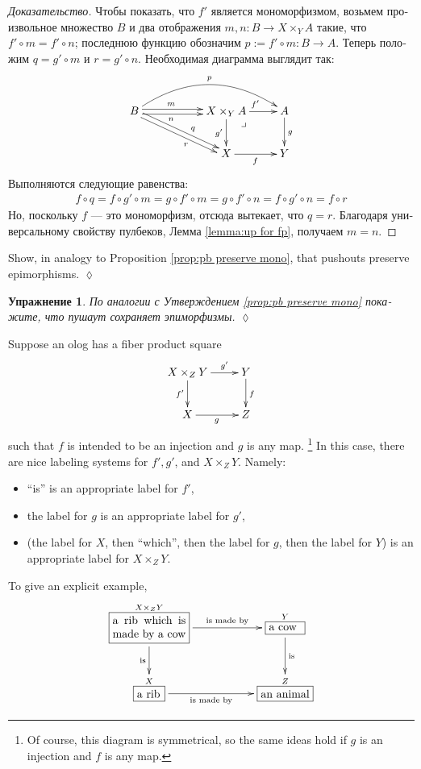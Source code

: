 \documentclass[a4paper]{book}
\makeatletter
\def\tn{\textnormal}
\def\to{\rightarrow}
\def\taking{\colon}
\newcommand{\LA}[2]{\ar[#1]^-{\tn {#2}}}
\newcommand{\LAL}[2]{\ar[#1]_-{\tn {#2}}}
\newcommand{\obox}[3]{\stackrel{#1}{\fbox{\parbox{#2}{#3}}}}
\def\ullimit{\ar@{}[rd]|(.3)*+{\lrcorner}}
\theoremstyle{myth}
\newtheorem{exampleENG}[envENG]{\begin{english}Example\end{english}}
\newtheorem{excENG}[envENG]{\begin{english}Exercise\end{english}}
\newenvironment{exerciseENG}{\begin{excENG}}{\hspace*{\fill}$\lozenge$\end{excENG}}
\newtheorem{excRUS}[envRUS]{Упражнение}
\newenvironment{proofRUS}{\begin{proof}[Доказательство]}{\end{proof}}
\newenvironment{exerciseRUS}{\begin{excRUS}}{\hspace*{\fill}$\lozenge$\end{excRUS}}
\makeatother
\begin{document}
\begin{russian}
\begin{proofRUS}
Чтобы показать, что $f'$ является мономорфизмом, возьмем произвольное множество $B$ и два отображения $m,n\taking B\to X\times_YA$ такие, что $f'\circ m=f'\circ n$; последнюю функцию обозначим $p:=f'\circ m\taking B\to A$. Теперь положим $q=g'\circ m$ и $r=g'\circ n$. Необходимая диаграмма выглядит так:
$$
\xymatrix{B\ar@<.5ex>[rr]^(.4)m\ar@<-.5ex>[rr]_(.4)n\ar@/^2pc/[rrr]^p\ar@<.5ex>[drr]^(.6)q\ar@<-.5ex>[drr]_(.6)r&&X\times_YA\ar[r]^{f'}\ar[d]_{g'}\ullimit&A\ar[d]^g\\&&X\ar[r]_f&Y}
$$
Выполняются следующие равенства:
\begin{align*}f\circ q=f\circ g'\circ m=g\circ f'\circ m=g\circ f'\circ n=f\circ g'\circ n=f\circ r\end{align*} 
Но, поскольку $f$ — это мономорфизм, отсюда вытекает, что $q=r$. Благодаря универсальному свойству пулбеков, Лемма \ref{lemma:up for fp}, получаем $m=n$.
\end{proofRUS}

\begin{exerciseENG}
Show, in analogy to Proposition \ref{prop:pb preserve mono}, that pushouts preserve epimorphisms.
\end{exerciseENG}

\begin{exerciseRUS}
По аналогии с Утверждением \ref{prop:pb preserve mono} покажите, что пушаут сохраняет эпиморфизмы.
\end{exerciseRUS}

\begin{exampleENG}\label{exc:olog pullbacks}
Suppose an olog has a fiber product square
$$\xymatrix{X\times_ZY\ar[r]^-{g'}\ar[d]_{f'}&Y\ar[d]^f\\X\ar[r]_g&Z}$$ such that $f$ is intended to be an injection and $g$ is any map.%
\footnote{Of course, this diagram is symmetrical, so the same ideas hold if $g$ is an injection and $f$ is any map.} 
In this case, there are nice labeling systems for $f', g'$, and $X\times_ZY$. Namely:
\begin{itemize}
\item “is” is an appropriate label for $f'$, 
\item the label for $g$ is an appropriate label for $g'$,
\item (the label for $X$, then “which”, then the label for $g$, then the label for $Y$) is an appropriate label for $X\times_ZY$.
\end{itemize}

To give an explicit example, 
$$\xymatrix{
\obox{X\times_ZY}{.9in}{a rib which is made by a cow}\LA{rr}{is made by}\LAL{d}{is}&&\obox{Y}{.4in}{a cow}\LA{d}{is}\\
\obox{X}{.3in}{a rib}\LAL{rr}{is made by}&&\obox{Z}{.6in}{an animal}
}
$$
\end{exampleENG}


\end{russian}
\end{document}
